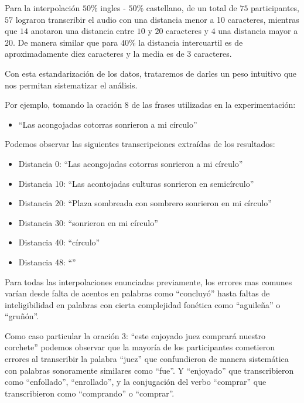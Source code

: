 Para la interpolación $50\%$ ingles - $50\%$ castellano, de un total de $75$ participantes, $57$ lograron transcribir el audio con una distancia menor a 10 caracteres, mientras que $14$ anotaron una distancia entre $10$ y $20$ caracteres y $4$ una distancia mayor a $20$. De manera similar que para $40\%$ la distancia intercuartil es de aproximadamente diez caracteres y la media es de $3$ caracteres.

Con esta estandarización de los datos, trataremos de darles un peso intuitivo que nos permitan sistematizar el análisis.

Por ejemplo, tomando la oración $8$ de las frases utilizadas en la experimentación: 

\begin{itemize}
	\item ``Las acongojadas cotorras sonrieron a mi círculo''
\end{itemize}

Podemos observar las siguientes transcripciones extraídas de los resultados:

\begin{itemize}
	\item Distancia 0: ``Las acongojadas cotorras sonrieron a mi círculo''
	\item Distancia 10: ``Las acontojadas culturas sonrieron en semicírculo''
	\item Distancia 20: ``Plaza sombreada con sombrero sonrieron en mi círculo''
	\item Distancia 30: ``sonrieron en mi círculo''
	\item Distancia 40: ``círculo''
	\item Distancia 48: ``''
\end{itemize}

Para todas las interpolaciones enunciadas previamente, los errores mas comunes varían desde falta de acentos en palabras como ``concluyó'' hasta faltas de inteligibilidad en palabras con cierta complejidad fonética como ``aguileña'' o ``gruñón''.

Como caso particular la oración $3$: ``este enjoyado juez comprará nuestro corchete'' podemos observar que la mayoría de los participantes cometieron errores al transcribir la palabra ``juez'' que confundieron de manera sistemática con palabras sonoramente similares como ``fue''. Y ``enjoyado'' que transcribieron como ``enfollado'', ``enrollado'', y la conjugación del verbo ``comprar'' que transcribieron como ``comprando'' o ``comprar''.

